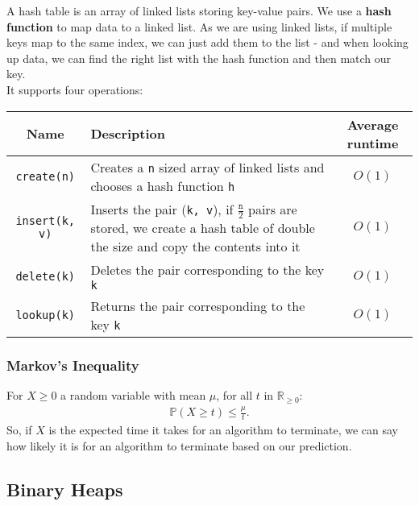 \documentclass[a4paper, 12pt, twoside]{article}
\begin{document}
A hash table is an array of linked lists storing key-value pairs. 
We use a \textbf{hash function} to map data to a linked list. As we 
are using linked lists, if multiple keys map to the same index, 
we can just add them to the list - and when looking up data, we 
can find the right list with the hash function and then match our key.
\\[\baselineskip]
It supports four operations:

\begin{center}
  \begin{tabular}{ || c | p{7.5cm} | c || }
    \hline
    Name & Description & Average runtime \\
    \hline
    \texttt{create(n)} & Creates a \texttt{n} sized array
    of linked lists and chooses a hash function \texttt{h} & $O(1)$ \\
    \hline
    \texttt{insert(k, v)} & Inserts the pair (\texttt{k, v}),
    if $\frac{\texttt{n}}{2}$ pairs are stored, we create a hash
    table of double the size and copy the contents into it & $O(1)$ \\
    \hline
    \texttt{delete(k)} & Deletes the pair corresponding to the key \texttt{k} & $O(1)$ \\
    \hline
    \texttt{lookup(k)} & Returns the pair corresponding to the key \texttt{k} & $O(1)$ \\
    \hline
  \end{tabular}
\end{center}

\subsubsection{Markov's Inequality}

For $X \geq 0$ a random variable with mean $\mu$, for all
$t$ in $\mathbb{R}_{\geq 0}$: \begin{gather*}
  \mathbb{P}(X \geq t) \leq \frac{\mu}{t}.
\end{gather*} So, if $X$ is the expected time it takes for an 
algorithm to terminate, we can say how likely it is for an algorithm
to terminate based on our prediction.

\subsection{Binary Heaps}
\end{document}
